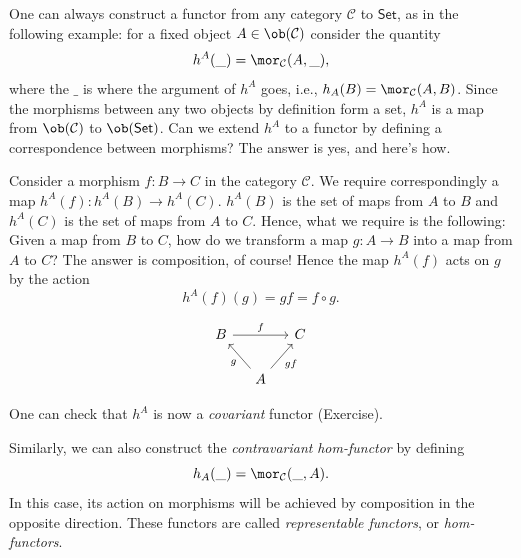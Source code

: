 \begin{example}\label{hom-functor example}
    \label{Representable functors} One can always construct a functor
    from any category $\mathcal{C}$ to $\mathsf{Set}$, as in the following
    example: for a fixed object $A\in\ob(\mathcal{C})$ consider the quantity
    \begin{equation}
    h^{A}(\_)=\mor_{\mathcal{C}}(A,\_),
    \end{equation}
    where the $\_$ is where the argument of $h^{A}$ goes, i.e., $h_{A}(B)=\mor_{\mathcal{C}}(A,B)$.
    Since the morphisms between any two objects by definition form a set,
    $h^{A}$ is a map from $\ob(\mathcal{C})$ to $\ob(\mathsf{Set})$.
    Can we extend $h^{A}$ to a functor by defining a correspondence between
    morphisms? The answer is yes, and here's how.

    Consider a morphism $f:B\rightarrow C$ in the category $\mathcal{C}$.
    We require correspondingly a map $h^{A}(f):h^{A}(B)\rightarrow h^{A}(C)$.
    $h^{A}(B)$ is the set of maps from $A$ to $B$ and $h^{A}(C)$ is
    the set of maps from $A$ to $C$. Hence, what we require is the following:
    Given a map from $B$ to $C$, how do we transform a map $g:A\rightarrow B$
    into a map from $A$ to $C$? The answer is composition, of course! Hence the map $h^{A}(f)$ acts on $g$ by the action
    \begin{equation}
    h^{A}(f)(g)=gf=f\circ g.
    \end{equation}

    \begin{equation}
    \begin{tikzcd}[column sep=small] 
    B \arrow[rr, "f"] & & C\\
    & A \arrow[lu, "g"] \arrow[ru, "gf"'] & 
    \end{tikzcd}
    \end{equation}

    One can check that $h^{A}$ is now a \emph{covariant} functor (Exercise).

    Similarly, we can also construct the \emph{contravariant} \emph{hom-functor}
    by defining\begin{equation} 
    h_A(\_) = \mor_\mathcal{C}(\_, A). 
    \end{equation} In this case, its action on morphisms will be achieved by composition
    in the opposite direction. These functors are called \emph{representable
    functors}, or \emph{hom-functors}.
\end{example}
